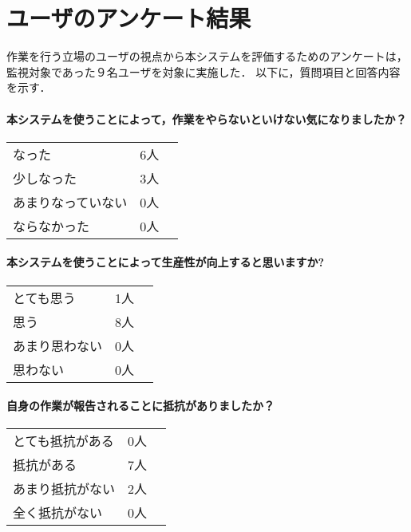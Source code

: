 \chapter{ユーザのアンケート結果}
作業を行う立場のユーザの視点から本システムを評価するためのアンケートは，監視対象であった９名ユーザを対象に実施した．
以下に，質問項目と回答内容を示す．

\subsubsection*{本システムを使うことによって，作業をやらないといけない気になりましたか？}

\begin{table}[htb]
  \begin{tabular}{ll}
    なった & 6人　\\
    少しなった & 3人 \\
    あまりなっていない & 0人 \\
    ならなかった & 0人
  \end{tabular}
\end{table}

\subsubsection*{本システムを使うことによって生産性が向上すると思いますか?}

\begin{table}[htb]
  \begin{tabular}{ll}
    とても思う & 1人　\\
    思う & 8人 \\
    あまり思わない & 0人 \\
    思わない & 0人
  \end{tabular}
\end{table}

\subsubsection*{自身の作業が報告されることに抵抗がありましたか？}

\begin{table}[htb]
  \begin{tabular}{ll}
    とても抵抗がある & 0人　\\
    抵抗がある & 7人 \\
    あまり抵抗がない & 2人 \\
    全く抵抗がない & 0人
  \end{tabular}
\end{table}

